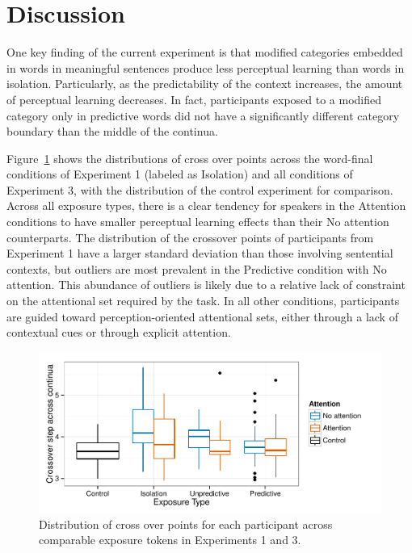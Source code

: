 \section{Discussion}

One key finding of the current experiment is that modified categories embedded in words in meaningful sentences produce less perceptual learning than words in isolation.  Particularly, as the predictability of the context increases, the amount of perceptual learning decreases.  In fact, participants exposed to a modified category only in predictive words did not have a significantly different category boundary than the middle of the continua. 

Figure~\ref{fig:exp13xoverdist} shows the distributions of cross over points across the word-final conditions of Experiment 1 (labeled as Isolation) and all conditions of Experiment 3, with the distribution of the control experiment for comparison.  Across all exposure types, there is a clear tendency for speakers in the Attention conditions to have smaller perceptual learning effects than their No attention counterparts.  The distribution of the crossover points of participants from Experiment 1 have a larger standard deviation than those involving sentential contexts, but outliers are most prevalent in the Predictive condition with No attention.  This abundance of outliers is likely due to a relative lack of constraint on the attentional set required by the task.  In all other conditions, participants are guided toward perception-oriented attentional sets, either through a lack of contextual cues or through explicit attention.

\begin{figure}[!ht]
\caption{Distribution of cross over points for each participant across comparable exposure tokens in Experiments 1 and 3.}
\label{fig:exp13xoverdist}
\begin{center}
\includegraphics[width=\textwidth]{graphs/exp13_xoverdist}
\end{center}
\end{figure}

